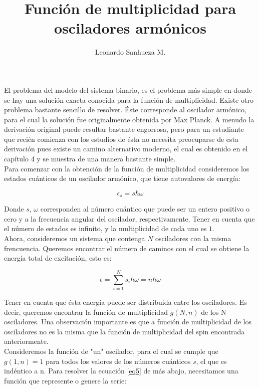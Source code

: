 \documentclass[a4paper,10pt]{article}
\title{Función de multiplicidad para osciladores armónicos}
\author{Leonardo Sanhueza M.}
\begin{document}
\maketitle

El problema del modelo del sistema binario, es el problema más simple en donde se hay una solución exacta conocida para la función de multiplicidad. Existe otro problema bastante sencillo de resolver. Éste corresponde al oscilador armónico, para el cual la solución fue originalmente obtenida por Max Planck. A menudo la derivación original puede resultar bastante engorrosa, pero para un estudiante que recién comienza con los estudios de ésta no necesita preocuparse de esta derivación pues existe un camino alternativo moderno, el cual es obtenido en el capítulo 4 y se muestra de una manera bastante simple. \\

Para comenzar con la obtención de la función de multiplicidad consideremos los estados cuánticos de un oscilador armónico, que tiene autovalores de energía:

\begin{equation}\label{eq1}
\epsilon_{s} = s \hbar \omega 
\end{equation} 

Donde $s$, $\omega$  corresponden al número cuántico que puede ser un entero positivo o cero y a la frecuencia angular del oscilador, respectivamente. Tener en cuenta que el número de estados es infinito, y la multiplicidad de cada uno es $1$. \\

Ahora, consideremos un sistema que contenga $N$ osciladores con la misma frencuencia. Queremos encontrar el número de caminos con el cual se obtiene la energía total de excitación, esto es:

\begin{equation}\label{eq2}
\epsilon = \sum_{i=1}^{N} s_{i} \hbar \omega = n \hbar \omega 
\end{equation}

Tener en cuenta que ésta energía puede ser distribuida entre los osciladores. Es decir, queremos encontrar la función de multiplicidad $g(N,n)$ de los N osciladores. Una observación importante es que a función de multiplicidad de los osciladores no es la misma que la función de multiplicidad del spin encontrada anteriormente. \\

Consideremos la función de "un" oscilador, para el cual se cumple que $g(1,n)=1$ para todos los valores de los números cuánticos $s$, el que es indéntico a n. Para resolver la ecuación \ref{eq5} de más abajo, necesitamos una función que represente o genere la serie:
\end{document}
